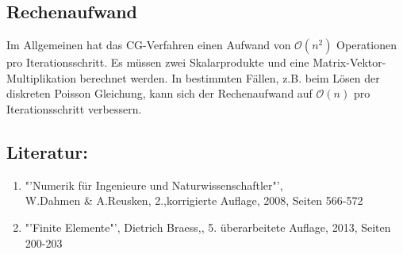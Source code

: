 \documentclass{article}
\begin{document}
\subsection{Rechenaufwand}
Im Allgemeinen hat das CG-Verfahren einen Aufwand von $\mathcal{O}(n^{2})$ Operationen pro Iterationsschritt. Es müssen zwei Skalarprodukte und eine Matrix-Vektor-Multiplikation berechnet werden. In bestimmten Fällen, z.B. beim Lösen der diskreten Poisson Gleichung, kann sich der Rechenaufwand auf $\mathcal{O}(n)$ pro Iterationsschritt verbessern.\\

\subsection{Literatur:}
\begin{enumerate}
\item "'Numerik für Ingenieure und Naturwissenschaftler"', \\W.Dahmen \& A.Reusken, 2.,korrigierte Auflage, 2008, Seiten 566-572
\item "'Finite Elemente"', Dietrich Braess,, 5. überarbeitete Auflage, 2013, Seiten 200-203
\end{enumerate}
\end{document}
